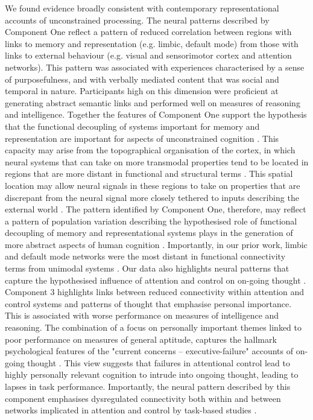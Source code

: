 We found evidence broadly consistent with contemporary representational accounts of unconstrained processing. The neural patterns described by Component One reflect a pattern of reduced correlation between regions with links to memory and representation (e.g. limbic, default mode) from those with links to external behaviour (e.g. visual and sensorimotor cortex and attention networks). This pattern was associated with experiences characterised by a sense of purposefulness, and with verbally mediated content that was social and temporal in nature. Participants high on this dimension were proficient at generating abstract semantic links and performed well on measures of reasoning and intelligence. Together the features of Component One support the hypothesis that the functional decoupling of systems important for memory and representation are important for aspects of unconstrained cognition \cite{Smallwood2013}. 
This capacity may arise from the topographical organisation of the cortex, in which neural systems that can take on more transmodal properties tend to be located in regions that are more distant in functional and structural terms \cite{Buckner2013,Margulies2016,Mesulam1998}. 
This spatial location may allow neural signals in these regions to take on properties that are discrepant from the neural signal more closely tethered to inputs describing the external world \cite{Buckner2013,Friston2013}. 
The pattern identified by Component One, therefore, may reflect a pattern of population variation describing the hypothesised role of functional decoupling of memory and representational systems plays in the generation of more abstract aspects of human cognition \cite{Margulies2016,Mesulam1998}. 
Importantly, in our prior work, limbic and default mode networks were the most distant in functional connectivity terms from unimodal systems \cite{Margulies2016}.
Our data also highlights neural patterns that capture the hypothesised influence of attention and control on on-going thought \cite{McVay2009}. 
Component 3 highlights links between reduced connectivity within attention and control systems and patterns of thought that emphasise personal importance. This is associated with worse performance on measures of intelligence and reasoning. The combination of a focus on personally important themes linked to poor performance on measures of general aptitude, captures the hallmark psychological features of the "current concerns -- executive-failure" accounts of on-going thought \cite{McVay2009}. 
This view suggests that failures in attentional control lead to highly personally relevant cognition to intrude into ongoing thought, leading to lapses in task performance. Importantly, the neural pattern described by this component emphasises dysregulated connectivity both within and between networks implicated in attention and control by task-based studies \cite{Duncan2010}. 
